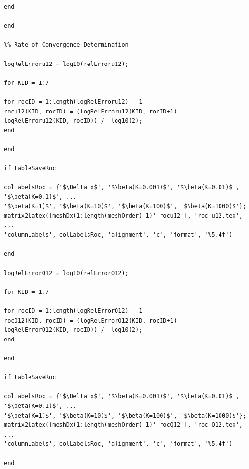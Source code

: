 \documentclass[10pt]{article}
\begin{document}
\begin{lstlisting}
end

end

%% Rate of Convergence Determination

logRelErroru12 = log10(relErroru12);

for KID = 1:7

for rocID = 1:length(logRelErroru12) - 1
rocu12(KID, rocID) = (logRelErroru12(KID, rocID+1) - logRelErroru12(KID, rocID)) / -log10(2);
end

end

if tableSaveRoc

colLabelsRoc = {'$\Delta x$', '$\beta(K=0.001)$', '$\beta(K=0.01)$', '$\beta(K=0.1)$', ...
'$\beta(K=1)$', '$\beta(K=10)$', '$\beta(K=100)$', '$\beta(K=1000)$'};
matrix2latex([meshDx(1:length(meshOrder)-1)' rocu12'], 'roc_u12.tex', ...
'columnLabels', colLabelsRoc, 'alignment', 'c', 'format', '%5.4f')

end

logRelErrorQ12 = log10(relErrorQ12);

for KID = 1:7

for rocID = 1:length(logRelErrorQ12) - 1
rocQ12(KID, rocID) = (logRelErrorQ12(KID, rocID+1) - logRelErrorQ12(KID, rocID)) / -log10(2);
end

end

if tableSaveRoc

colLabelsRoc = {'$\Delta x$', '$\beta(K=0.001)$', '$\beta(K=0.01)$', '$\beta(K=0.1)$', ...
'$\beta(K=1)$', '$\beta(K=10)$', '$\beta(K=100)$', '$\beta(K=1000)$'};
matrix2latex([meshDx(1:length(meshOrder)-1)' rocQ12'], 'roc_Q12.tex', ...
'columnLabels', colLabelsRoc, 'alignment', 'c', 'format', '%5.4f')

end
\end{lstlisting}
\end{document}

